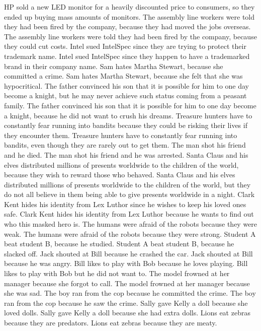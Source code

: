 \documentclass{article}
\begin{document}
\begin{enumerate}
	HP sold a new LED monitor for a heavily discounted price to consumers, so they ended up buying mass amounts of monitors.
	The assembly line workers were told they had been fired by the company, because they had moved the jobs overseas.
	The assembly line workers were told they had been fired by the company, because they could cut costs.
	Intel sued IntelSpec since they are trying to protect their trademark name.
	Intel sued IntelSpec since they happen to have a trademarked brand in their company name.
	Sam hates Martha Stewart, because she committed a crime.
	Sam hates Martha Stewart, because she felt that she was hypocritical.
	The father convinced his son that it is possible for him to one day become a knight, but he may never achieve such status coming from a peasant family.
	The father convinced his son that it is possible for him to one day become a knight, because he did not want to crush his dreams.
	Treasure hunters have to constantly fear running into bandits because they could be risking their lives if they encounter them.
	Treasure hunters have to constantly fear running into bandits, even though they are rarely out to get them.
	The man shot his friend and he died.
	The man shot his friend and he was arrested.
	Santa Claus and his elves distributed millions of presents worldwide to the children of the world, because they wish to reward those who behaved.
	Santa Claus and his elves distributed millions of presents worldwide to the children of the world, but they do not all believe in them being able to give presents worldwide in a night.
	Clark Kent hides his identity from Lex Luthor since he wishes to keep his loved ones safe.
	Clark Kent hides his identity from Lex Luthor because he wants to find out who this masked hero is.
	The humans were afraid of the robots because they were weak.
	The humans were afraid of the robots because they were strong.
	Student A beat student B, because he studied.
	Student A beat student B, because he slacked off.
	Jack shouted at Bill because he crashed the car.
	Jack shouted at Bill because he was angry.
	Bill likes to play with Bob because he loves playing.
	Bill likes to play with Bob but he did not want to.
	The model frowned at her manager because she forgot to call.
	The model frowned at her manager because she was sad.
	The boy ran from the cop because he committed the crime.
	The boy ran from the cop because he saw the crime.
	Sally gave Kelly a doll because she loved dolls.
	Sally gave Kelly a doll because she had extra dolls.
	Lions eat zebras because they are predators.
	Lions eat zebras because they are meaty.

\end{enumerate}
\end{document}
